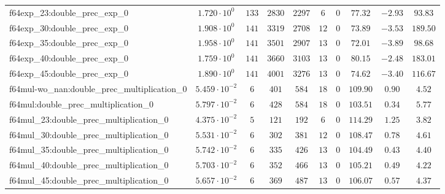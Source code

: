 \begin{tabular}{|l|c|c|c|c|c|c|c|c|c|}
f64exp\_23:double\_prec\_exp\_0                & $ 1.720 \cdot 10^{0}  $ & $ 133    $ & $ 2830   $ & $ 2297  $ & $ 6   $ & $ 0  $ & $ 77.32       $ & $ -2.93   $ & $ 93.83   $ \\
f64exp\_30:double\_prec\_exp\_0                & $ 1.908 \cdot 10^{0}  $ & $ 141    $ & $ 3319   $ & $ 2708  $ & $ 12  $ & $ 0  $ & $ 73.89       $ & $ -3.53   $ & $ 189.50  $ \\
f64exp\_35:double\_prec\_exp\_0                & $ 1.958 \cdot 10^{0}  $ & $ 141    $ & $ 3501   $ & $ 2907  $ & $ 13  $ & $ 0  $ & $ 72.01       $ & $ -3.89   $ & $ 98.68   $ \\
f64exp\_40:double\_prec\_exp\_0                & $ 1.759 \cdot 10^{0}  $ & $ 141    $ & $ 3660   $ & $ 3103  $ & $ 13  $ & $ 0  $ & $ 80.15       $ & $ -2.48   $ & $ 183.01  $ \\
f64exp\_45:double\_prec\_exp\_0                & $ 1.890 \cdot 10^{0}  $ & $ 141    $ & $ 4001   $ & $ 3276  $ & $ 13  $ & $ 0  $ & $ 74.62       $ & $ -3.40   $ & $ 116.67  $ \\
f64mul-wo\_nan:double\_prec\_multiplication\_0 & $ 5.459 \cdot 10^{-2} $ & $ 6      $ & $ 401    $ & $ 584   $ & $ 18  $ & $ 0  $ & $ 109.90      $ & $ 0.90    $ & $ 4.52    $ \\
f64mul:double\_prec\_multiplication\_0         & $ 5.797 \cdot 10^{-2} $ & $ 6      $ & $ 428    $ & $ 584   $ & $ 18  $ & $ 0  $ & $ 103.51      $ & $ 0.34    $ & $ 5.77    $ \\
f64mul\_23:double\_prec\_multiplication\_0     & $ 4.375 \cdot 10^{-2} $ & $ 5      $ & $ 121    $ & $ 192   $ & $ 6   $ & $ 0  $ & $ 114.29      $ & $ 1.25    $ & $ 3.82    $ \\
f64mul\_30:double\_prec\_multiplication\_0     & $ 5.531 \cdot 10^{-2} $ & $ 6      $ & $ 302    $ & $ 381   $ & $ 12  $ & $ 0  $ & $ 108.47      $ & $ 0.78    $ & $ 4.61    $ \\
f64mul\_35:double\_prec\_multiplication\_0     & $ 5.742 \cdot 10^{-2} $ & $ 6      $ & $ 335    $ & $ 426   $ & $ 13  $ & $ 0  $ & $ 104.49      $ & $ 0.43    $ & $ 4.40    $ \\
f64mul\_40:double\_prec\_multiplication\_0     & $ 5.703 \cdot 10^{-2} $ & $ 6      $ & $ 352    $ & $ 466   $ & $ 13  $ & $ 0  $ & $ 105.21      $ & $ 0.49    $ & $ 4.22    $ \\
f64mul\_45:double\_prec\_multiplication\_0     & $ 5.657 \cdot 10^{-2} $ & $ 6      $ & $ 369    $ & $ 487   $ & $ 13  $ & $ 0  $ & $ 106.07      $ & $ 0.57    $ & $ 4.37    $ \\

\end{tabular}
